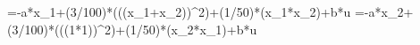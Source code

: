 =-a*x_1+(3/100)*(((x_1+x_2))^2)+(1/50)*(x_1*x_2)+b*u
=-a*x_2+(3/100)*(((1*1))^2)+(1/50)*(x_2*x_1)+b*u
